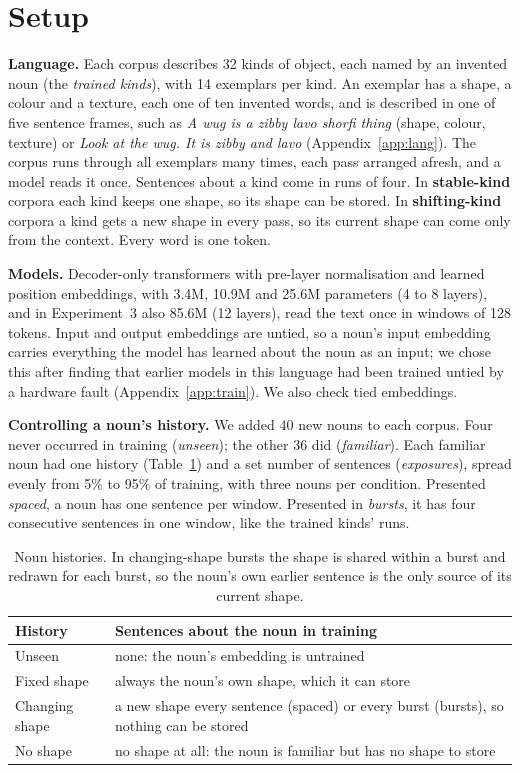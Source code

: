 \documentclass[11pt]{article}
\begin{document}
\section{Setup}\label{sec:setup}\label{sec:background}
\textbf{Language.} Each corpus describes 32 kinds of object, each named by an invented noun (the \emph{trained kinds}), with 14 exemplars per kind. An exemplar has a shape, a colour and a texture, each one of ten invented words, and is described in one of five sentence frames, such as \emph{A wug is a zibby lavo shorfi thing} (shape, colour, texture) or \emph{Look at the wug. It is zibby and lavo} (Appendix~\ref{app:lang}). The corpus runs through all exemplars many times, each pass arranged afresh, and a model reads it once. Sentences about a kind come in runs of four. In \textbf{stable-kind} corpora each kind keeps one shape, so its shape can be stored. In \textbf{shifting-kind} corpora a kind gets a new shape in every pass, so its current shape can come only from the context. Every word is one token.

\textbf{Models.} Decoder-only transformers with pre-layer normalisation and learned position embeddings, with 3.4M, 10.9M and 25.6M parameters (4 to 8 layers), and in Experiment~3 also 85.6M (12 layers), read the text once in windows of 128 tokens. Input and output embeddings are untied, so a noun's input embedding carries everything the model has learned about the noun as an input; we chose this after finding that earlier models in this language had been trained untied by a hardware fault (Appendix~\ref{app:train}). We also check tied embeddings.

\textbf{Controlling a noun's history.} We added 40 new nouns to each corpus. Four never occurred in training (\emph{unseen}); the other 36 did (\emph{familiar}). Each familiar noun had one history (Table~\ref{tab:design}) and a set number of sentences (\emph{exposures}), spread evenly from 5\% to 95\% of training, with three nouns per condition. Presented \emph{spaced}, a noun has one sentence per window. Presented in \emph{bursts}, it has four consecutive sentences in one window, like the trained kinds' runs.

\begin{table}[t]
\centering
\small
\setlength{\tabcolsep}{3pt}
\begin{tabular}{@{}p{}p{}@{}}
\toprule
History & Sentences about the noun in training \\
\midrule
Unseen & none: the noun's embedding is untrained \\
Fixed shape & always the noun's own shape, which it can store \\
Changing shape & a new shape every sentence (spaced) or every burst (bursts), so nothing can be stored \\
No shape & no shape at all: the noun is familiar but has no shape to store \\
\bottomrule
\end{tabular}
\caption{Noun histories. In changing-shape bursts the shape is shared within a burst and redrawn for each burst, so the noun's own earlier sentence is the only source of its current shape.}
\label{tab:design}
\end{table}
\end{document}
